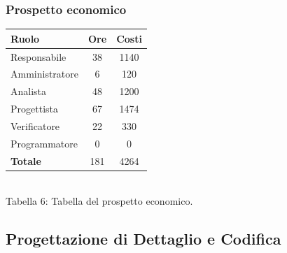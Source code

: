 \subsubsection{Prospetto economico}
\begin{center}
\begin{tabular}{| l | c | c |}
\hline
Ruolo & Ore & Costi \\
\hline
Responsabile & 38 & 1140 \\
Amministratore & 6 & 120 \\
Analista & 48 & 1200 \\
Progettista & 67 & 1474 \\
Verificatore & 22 & 330 \\
Programmatore & 0 & 0 \\
\hline
\textbf{Totale} & 181 & 4264 \\
\hline
\end{tabular}
\\
Tabella 6: Tabella del prospetto economico.
\end{center}
\subsection{Progettazione di Dettaglio e Codifica}
